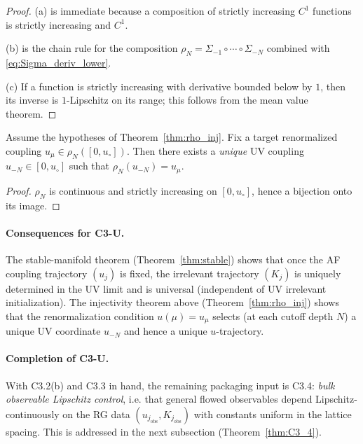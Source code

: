 \begin{proof}
(a) is immediate because a composition of strictly increasing $C^1$ functions is strictly increasing and $C^1$.

(b) is the chain rule for the composition $\rho_N=\Sigma_{-1}\circ\cdots\circ \Sigma_{-N}$ combined with \eqref{eq:Sigma_deriv_lower}.

(c) If a function is strictly increasing with derivative bounded below by $1$, then its inverse is $1$-Lipschitz on its range; this follows from the mean value theorem.
\end{proof}

\begin{corollary}\label{cor:tuning_unique}
Assume the hypotheses of Theorem~\ref{thm:rho_inj}.
Fix a target renormalized coupling $u_\mu\in \rho_N([0,u_\circ])$.
Then there exists a \emph{unique} UV coupling $u_{-N}\in[0,u_\circ]$ such that $\rho_N(u_{-N})=u_\mu$.
\end{corollary}

\begin{proof}
$\rho_N$ is continuous and strictly increasing on $[0,u_\circ]$, hence a bijection onto its image.
\end{proof}


\paragraph{Consequences for C3-U.}
The stable-manifold theorem (Theorem~\ref{thm:stable}) shows that once the AF coupling trajectory $(u_j)$ is fixed, the irrelevant trajectory $(K_j)$ is uniquely determined in the UV limit and is universal (independent of UV irrelevant initialization).
The injectivity theorem above (Theorem~\ref{thm:rho_inj}) shows that the renormalization condition $u(\mu)=u_\mu$ selects (at each cutoff depth $N$) a unique UV coordinate $u_{-N}$ and hence a unique $u$-trajectory.

\paragraph{Completion of C3-U.}
With C3.2(b) and C3.3 in hand, the remaining packaging input is C3.4: \emph{bulk observable Lipschitz control}, i.e. that general flowed observables depend Lipschitz-continuously on the RG data $(u_{j_{\mathrm{obs}}},K_{j_{\mathrm{obs}}})$ with constants uniform in the lattice spacing.
This is addressed in the next subsection (Theorem~\ref{thm:C3_4}).
